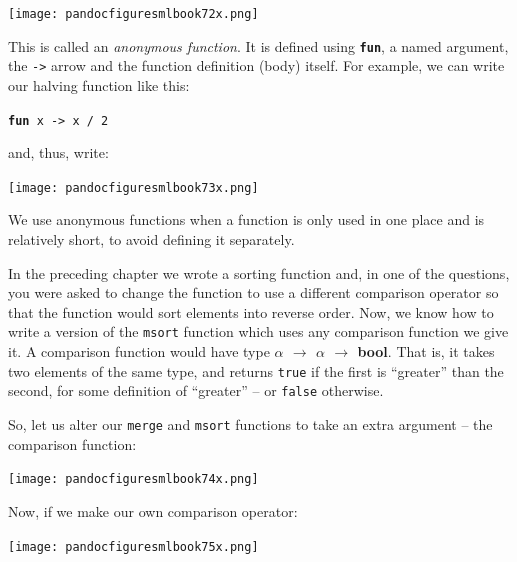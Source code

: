 \documentclass[]{book}
\begin{document}
\medskip
\begin{center}
\noindent\texttt{[image: pandocfiguresmlbook72x.png]}
\end{center}
\medskip

\noindent This is called an \textit{anonymous function}. It is defined using \texttt{\textbf{fun}}, a named argument, the \texttt{->} arrow and the function definition (body) itself. For example, we can write our halving function like this:

\vspace{2mm}
\textbf{\texttt{fun}}\texttt{ x -> x / 2}
\vspace{2mm}

\noindent and, thus, write:

\medskip
\begin{center}
\noindent\texttt{[image: pandocfiguresmlbook73x.png]}
\end{center}
\medskip

\noindent We use anonymous functions when a function is only used in one place and is relatively short, to avoid defining it separately.

In the preceding chapter we wrote a sorting function and, in one of the questions, you were asked to change the function to use a different comparison operator so that the function would sort elements into reverse order. Now, we know how to write a version of the \texttt{msort} function which uses any comparison function we give it. A comparison function would have type \textbf{\textsf{$\alpha$ $\rightarrow$ $\alpha$ $\rightarrow$ bool}}. That is, it takes two elements of the same type, and returns \texttt{true} if the first is ``greater'' than the second, for some definition of ``greater'' -- or \texttt{false} otherwise.

So, let us alter our \texttt{merge} and \texttt{msort} functions to take an extra argument -- the comparison function:

\medskip
\begin{center}
\noindent\texttt{[image: pandocfiguresmlbook74x.png]}
\end{center}
\medskip

Now, if we make our own comparison operator:

\medskip
\begin{center}
\noindent\texttt{[image: pandocfiguresmlbook75x.png]}
\end{center}
\medskip
\end{document}
